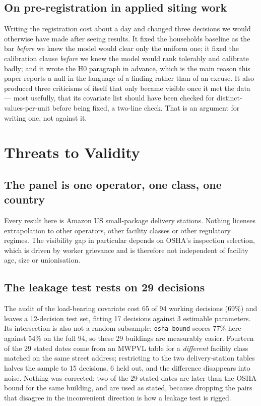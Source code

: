 \documentclass[conference]{IEEEtran}
\begin{document}
\subsection{On pre-registration in applied siting work}

Writing the registration cost about a day and changed three decisions we would
otherwise have made after seeing results. It fixed the households baseline as
the bar \emph{before} we knew the model would clear only the uniform one; it
fixed the calibration clause \emph{before} we knew the model would rank
tolerably and calibrate badly; and it wrote the H0 paragraph in advance, which
is the main reason this paper reports a null in the language of a finding
rather than of an excuse. It also produced three criticisms of itself that only
became visible once it met the data --- most usefully, that its covariate list
should have been checked for distinct-values-per-unit before being fixed, a
two-line check. That is an argument for writing one, not against it.

\section{Threats to Validity}
\label{sec:threats}

\subsection{The panel is one operator, one class, one country}

Every result here is Amazon US small-package delivery stations. Nothing
licenses extrapolation to other operators, other facility classes or other
regulatory regimes. The visibility gap in particular depends on OSHA's
inspection selection, which is driven by worker grievance and is therefore not
independent of facility age, size or unionisation.

\subsection{The leakage test rests on 29 decisions}

The audit of the load-bearing covariate cost 65 of 94 working decisions (69\%)
and leaves a 12-decision test set, fitting 17 decisions against 3 estimable
parameters. Its intersection is also not a random subsample: \texttt{osha\_bound}
scores 77\% here against 54\% on the full 94, so these 29 buildings are
measurably easier. Fourteen of the 29 stated dates come from an MWPVL table for
a \emph{different} facility class matched on the same street address;
restricting to the two delivery-station tables halves the sample to 15
decisions, 6 held out, and the difference disappears into noise. Nothing was
corrected: two of the 29 stated dates are later than the OSHA bound for the
same building, and are used as stated, because dropping the pairs that
disagree in the inconvenient direction is how a leakage test is rigged.
\end{document}
